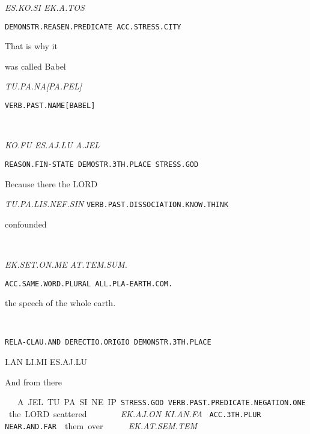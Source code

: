 {{\it ES.KO.SI				EK.A.TOS		 }

{\tt DEMONSTR.REASEN.PREDICATE	ACC.STRESS.CITY	 }

That is why 				it 			

\drie
 
was called Babel 

{\it TU.PA.NA[PA.PEL] }

{\tt VERB.PAST.NAME[BABEL] }

\tu\pa\na\cartouche{\pa\pel}

\drie


\ko\fu~\es\aj\lu~\Atlana\jel

{\it KO.FU			ES.AJ.LU			A.JEL }

{\tt REASON.FIN-STATE          DEMOSTR.3TH.PLACE		STRESS.GOD }

Because 		there 				the LORD  
\drie

\tu\pa\lis\nef\Atlansin

{\it TU.PA.LIS.NEF.SIN}                                              			 
{\tt VERB.PAST.DISSOCIATION.KNOW.THINK	 }

confounded 
\drie

 

\at\tem\Atlansum~\ek\set\on\me\period

{\it EK.SET.ON.ME      AT.TEM.SUM.			}


{\tt ACC.SAME.WORD.PLURAL 	ALL.PLA-EARTH.COM. }

the speech			 of the whole earth.

\drie

\Atlani\an~\li\mi~\es\aj\lu

{\tt RELA-CLAU.AND	DERECTIO.ORIGIO      DEMONSTR.3TH.PLACE }

I.AN			LI.MI			ES.AJ.LU			 

And 			from 			there 		
\drie

\Atlana\jel~\tu\pa\si\Atlanne\ip

A.JEL		TU.PA.SI.NE.IP    

{\tt STRESS.GOD	VERB.PAST.PREDICATE.NEGATION.ONE }

the LORD	scattered 
\drie

 
\ek\aj\on~\ki\an\fa

{\it EK.AJ.ON	KI.AN.FA               }

{\tt ACC.3TH.PLUR	NEAR.AND.FAR	 }

them 		over 		 
\drie
  
\ek\at\sem\tem

{\it EK.AT.SEM.TEM }

}
